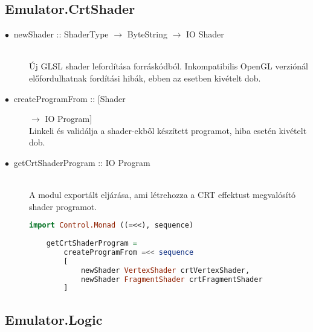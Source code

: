 \subsection{Emulator.CrtShader}

\begin{description}
	\item[$\bullet\:$ newShader :: ShaderType $\rightarrow$ ByteString $\rightarrow$ IO Shader] \hfill \\
	Új GLSL shader lefordítása forráskódból. Inkompatibilis OpenGL verziónál előfordulhatnak fordítási hibák, ebben az esetben kivételt dob.
	\item[$\bullet\:$ createProgramFrom :: [Shader] $\rightarrow$ IO Program] \hfill \\
	Linkeli és validálja a shader-ekből készített programot, hiba esetén kivételt dob.
	\item[$\bullet\:$ getCrtShaderProgram :: IO Program] \hfill \\
	A modul exportált eljárása, ami létrehozza a CRT effektust megvalósító shader programot.
	
	\begin{lstlisting}[language=Haskell, basicstyle=\scriptsize]
	import Control.Monad ((=<<), sequence)
	
	getCrtShaderProgram = 
		createProgramFrom =<< sequence 
		[
			newShader VertexShader crtVertexShader, 
			newShader FragmentShader crtFragmentShader
		]
	\end{lstlisting}
\end{description}

\subsection{Emulator.Logic}

